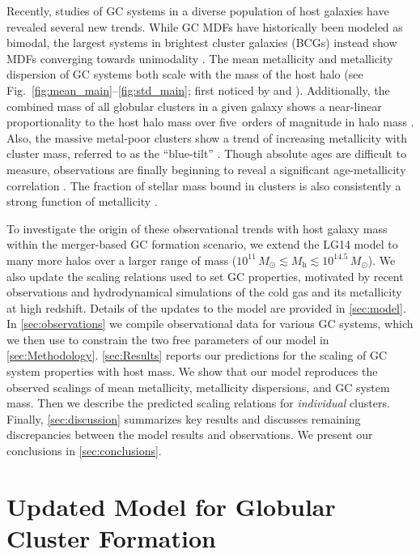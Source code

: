\documentclass[fleqn,usenatbib]{mnras}
\newcommand{\Mh}{M_{\mathrm{h}}}
\newcommand{\Msun}{\,M_{\odot}}
\begin{document}
Recently, studies of GC systems in a diverse population of host galaxies have revealed several new trends. While GC MDFs have historically been modeled as bimodal, the largest systems in brightest cluster galaxies (BCGs) instead show MDFs converging towards unimodality \citep{harris_etal14_bcg1, harris_etal16_bcg2, harris_etal17_bcg3}. The mean metallicity and metallicity dispersion of GC systems both scale with the mass of the host halo (see Fig.~\ref{fig:mean_main}--\ref{fig:std_main}; first noticed by \citealt{peng_etal06} and \citealt{jordan_etal_2007}). Additionally, the combined mass of all globular clusters in a given galaxy shows a near-linear proportionality to the host halo mass over five~orders of magnitude in halo mass \citep{harris_etal_2015}. Also, the massive metal-poor clusters show a trend of increasing metallicity with cluster mass, referred to as the ``blue-tilt'' \citep{strader_etal06, harris_etal06, harris_etal17_bcg3}. Though absolute ages are difficult to measure, observations are finally beginning to reveal a significant age-metallicity correlation \citep{dotter_etal11, georgiev_etal12, leaman_etal13}. The fraction of stellar mass bound in clusters is also consistently a strong function of metallicity \citep[e.g.,][]{harris&harris_2002, beasley_etal_2008, lamers_etal_2017}.

To investigate the origin of these observational trends with host galaxy mass within the merger-based GC formation scenario, we extend the LG14 model to many more halos over a larger range of mass ($10^{11}\Msun \lesssim \Mh \lesssim 10^{14.5}\Msun$). We also update the scaling relations used to set GC properties, motivated by recent observations and hydrodynamical simulations of the cold gas and its metallicity at high redshift. Details of the updates to the model are provided in \autoref{sec:model}. In \autoref{sec:observations} we compile observational data for various GC systems, which we then use to constrain the two free parameters of our model in \autoref{sec:Methodology}. \autoref{sec:Results} reports our predictions for the scaling of GC system properties with host mass. We show that our model reproduces the observed scalings of mean metallicity, metallicity dispersions, and GC system mass. Then we describe the predicted scaling relations for \textit{individual} clusters. Finally, \autoref{sec:discussion} summarizes key results and discusses remaining discrepancies between the model results and observations. We present our conclusions in \autoref{sec:conclusions}.

\section{Updated Model for Globular Cluster Formation} \label{sec:model}
\end{document}

